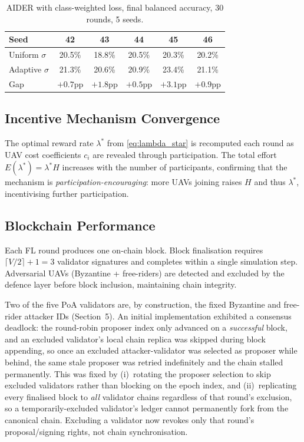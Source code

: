 \documentclass[12pt,a4paper]{article}
\begin{document}
\begin{table}[H]
  \centering
  \caption{AIDER with class-weighted loss, final balanced accuracy, 30 rounds, 5 seeds.}
  \label{tab:aider-cwl}
  \begin{tabular}{lccccc}
    \toprule
    Seed & 42 & 43 & 44 & 45 & 46 \\
    \midrule
    Uniform $\sigma$ & 20.5\% & 18.8\% & 20.5\% & 20.3\% & 20.2\% \\
    Adaptive $\sigma$ & 21.3\% & 20.6\% & 20.9\% & 23.4\% & 21.1\% \\
    Gap & $+0.7$pp & $+1.8$pp & $+0.5$pp & $+3.1$pp & $+0.9$pp \\
    \bottomrule
  \end{tabular}
\end{table}

\subsection{Incentive Mechanism Convergence}

The optimal reward rate $\lambda^*$ from \eqref{eq:lambda_star} is recomputed each
round as UAV cost coefficients $c_i$ are revealed through participation.  The
total effort $E(\lambda^*) = \lambda^* H$ increases with the number of participants,
confirming that the mechanism is \emph{participation-encouraging}: more UAVs joining
raises $H$ and thus $\lambda^*$, incentivising further participation.

\subsection{Blockchain Performance}

Each FL round produces one on-chain block.  Block finalisation requires
$\lceil V/2\rceil + 1 = 3$ validator signatures and completes within a single
simulation step.  Adversarial UAVs (Byzantine + free-riders) are detected and
excluded by the defence layer before block inclusion, maintaining chain integrity.

Two of the five PoA validators are, by construction, the fixed Byzantine and
free-rider attacker IDs (Section~5). An initial implementation exhibited a
consensus deadlock: the round-robin proposer index only advanced on a
\emph{successful} block, and an excluded validator's local chain replica was
skipped during block appending, so once an excluded attacker-validator was
selected as proposer while behind, the same stale proposer was retried
indefinitely and the chain stalled permanently. This was fixed by (i)~rotating
the proposer selection to skip excluded validators rather than blocking on the
epoch index, and (ii)~replicating every finalised block to \emph{all} validator
chains regardless of that round's exclusion, so a temporarily-excluded
validator's ledger cannot permanently fork from the canonical chain. Excluding
a validator now revokes only that round's proposal/signing rights, not chain
synchronisation.
\end{document}

